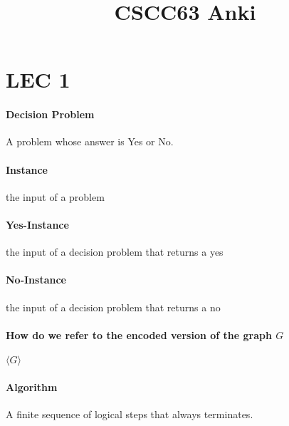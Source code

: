 \documentclass[12pt]{article}
\begin{document}
\title{CSCC63 Anki}
\maketitle

\section{LEC 1}

\paragraph{Decision Problem} A problem whose answer is Yes or No.

\paragraph{Instance} the input of a problem

\paragraph{Yes-Instance} the input of a decision problem that returns a yes

\paragraph{No-Instance} the input of a decision problem that returns a no

\paragraph{How do we refer to the encoded version of the graph $G$} $\langle G \rangle$

\paragraph{Algorithm} A finite sequence of logical steps that always terminates.
\end{document}
